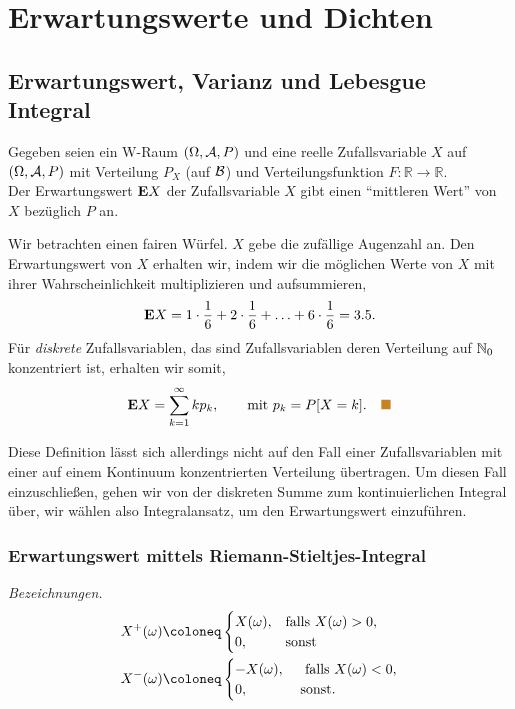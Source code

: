 \chapter{Erwartungswerte und Dichten}

\section{Erwartungswert, Varianz und Lebesgue Integral}

Gegeben seien ein W-Raum $(\Omega, \AA, P)$ und eine reelle Zufallsvariable $X$ auf
$(\Omega, \AA, P)$ mit Verteilung $P_{X}$ (auf ${\BB}$) und Verteilungsfunktion
$F:\mathbb{R} \to \mathbb{R}$.\\

Der Erwartungswert $\E X$ der Zufallsvariable $X$ gibt einen ``mittleren Wert'' von $X$
bezüglich $P$ an.

\begin{bsp}
Wir betrachten einen fairen Würfel.
$X$ gebe die zufällige Augenzahl an. Den Erwartungswert von $X$ erhalten wir,
indem wir die möglichen Werte von $X$ mit ihrer Wahrscheinlichkeit
multiplizieren und aufsummieren,
\begin{align*}
\E X = 1\cdot \frac{1}{6} + 2\cdot \frac{1}{6} + \ldots + 6\cdot \frac{1}{6} =
3.5.
\end{align*}
Für \emph{diskrete} Zufallsvariablen, das sind Zufallsvariablen deren
Verteilung auf $\N_0$ konzentriert ist, erhalten wir somit,
\begin{align*}
\E X = \sum\limits_{k=1}^\infty k p_k,\qquad
\text{mit } p_k = P[X=k].\bsphere
\end{align*}
\end{bsp}

Diese Definition lässt sich allerdings nicht auf den Fall einer
Zufallsvariablen mit einer auf einem  Kontinuum konzentrierten Verteilung
übertragen. Um diesen Fall einzuschließen, gehen wir von der diskreten Summe
zum kontinuierlichen Integral über, wir wählen also Integralansatz, um den
Erwartungswert einzuführen.

\subsection{Erwartungswert mittels Riemann-Stieltjes-Integral}

\textit{Bezeichnungen.}
\begin{align*}
&X^{+}(\omega)\defl
\begin{cases}
X(\omega), &\text{falls } X(\omega) > 0,\\
0,          &\text{sonst }
\end{cases}\\
&X^{-}(\omega)\defl
\begin{cases}
-X(\omega), \; &\text{ falls } X (\omega) < 0,\\
0,              &\text{sonst. }
\end{cases}
\end{align*}

